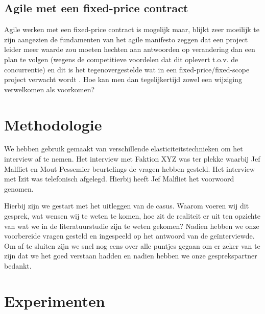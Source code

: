 \documentclass{hogent-article}
\begin{document}
    \subsection{Agile met een fixed-price contract}
    Agile werken met een fixed-price contract is mogelijk maar, blijkt zeer moeilijk te zijn aangezien de fundamenten van het agile manifesto zeggen dat een project leider meer waarde zou moeten hechten aan antwoorden op verandering dan een plan te volgen (wegens de competitieve voordelen dat dit oplevert t.o.v. de concurrentie) en dit is het tegenovergestelde wat in een fixed-price/fixed-scope project verwacht wordt \autocite{PMI2011}. Hoe kan men dan tegelijkertijd zowel een wijziging verwelkomen als voorkomen?
	
	\section{Methodologie}
	We hebben gebruik gemaakt van verschillende elasticiteitstechnieken om het interview af te nemen. Het interview met Faktion XYZ was ter plekke waarbij Jef Malfliet en Mout Pessemier beurtelings de vragen hebben gesteld. Het interview met Izit was telefonisch afgelegd. Hierbij heeft Jef Malfliet het voorwoord genomen.
	
	Hierbij zijn we gestart met het uitleggen van de casus. Waarom voeren wij dit gesprek, wat wensen wij te weten te komen, hoe zit de realiteit er uit ten opzichte van wat we in de literatuurstudie zijn te weten gekomen? Nadien hebben we onze voorbereide vragen gesteld en ingespeeld op het antwoord van de geïnterviewde. Om af te sluiten zijn we snel nog eens over alle puntjes gegaan om er zeker van te zijn dat we het goed verstaan hadden en nadien hebben we onze gesprekspartner bedankt.
	
	\section{Experimenten}
\end{document}
